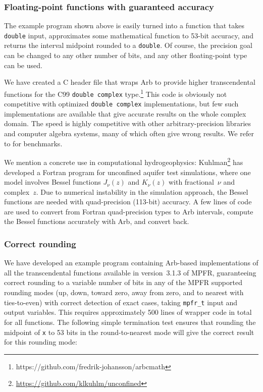 \documentclass[10pt,journal,compsoc,cspaper]{IEEEtran}
\begin{document}
\subsubsection{Floating-point functions with guaranteed accuracy}

The example program shown above is easily turned into
a function that takes \texttt{double} input,
approximates some mathematical function to 53-bit accuracy,
and returns the interval midpoint rounded to a \texttt{double}.
Of course, the precision goal can be changed to any other
number of bits, and any other floating-point type can be used.

We have created a C header file that wraps Arb to
provide higher transcendental
functions for the C99 \texttt{double complex} type.\footnote{https://github.com/fredrik-johansson/arbcmath}
This code is obviously not competitive with optimized \texttt{double complex}
implementations, but few such implementations are available
that give accurate results on the whole complex domain.
The speed is highly competitive with other arbitrary-precision
libraries and computer algebra systems, many of which often
give wrong results. We refer to \cite{Johansson2016hypergeometric}
for benchmarks.

We mention a concrete use in computational hydrogeophysics:
Kuhlman\footnote{\url{https://github.com/klkuhlm/unconfined}} %
has developed a Fortran program for
unconfined aquifer test simulations,
where one model involves Bessel functions $J_{\nu}(z)$ and $K_{\nu}(z)$
with fractional~$\nu$ and complex~$z$.
Due to numerical instability in the simulation approach,
the Bessel functions are needed with
quad-precision (113-bit) accuracy.
A few lines of code are used to convert from Fortran quad-precision
types to Arb intervals, compute the Bessel functions accurately with Arb,
and convert back.

\subsubsection{Correct rounding}

We have developed an example program
containing Arb-based implementations of all the transcendental
functions available in version~3.1.3 of MPFR, guaranteeing
correct rounding to a variable number of bits in any of the MPFR supported
rounding modes (up, down, toward zero, away from zero, and to nearest
with ties-to-even) with correct detection of exact cases,
taking \texttt{mpfr\_t} input and output variables.
This requires approximately 500 lines of wrapper code in total for all functions.
The following simple termination test ensures that rounding the
midpoint of \texttt{x} to 53 bits in the round-to-nearest
mode will give the correct result
for this rounding mode:
\end{document}
